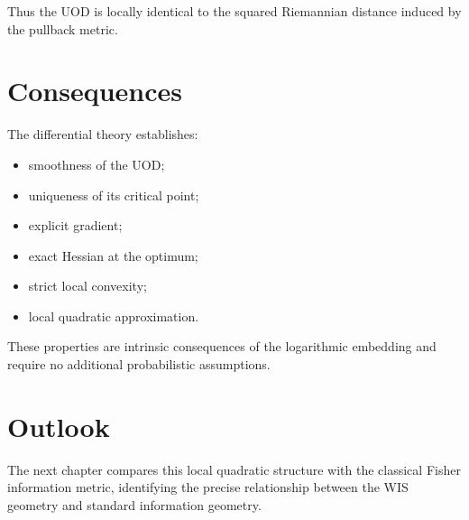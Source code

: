 Thus the UOD is locally identical to the squared Riemannian distance
induced by the pullback metric.

\section{Consequences}\label{ch:sec:consequences}

The differential theory establishes:
\begin{itemize}
\item smoothness of the UOD;
\item uniqueness of its critical point;
\item explicit gradient;
\item exact Hessian at the optimum;
\item strict local convexity;
\item local quadratic approximation.
\end{itemize}

These properties are intrinsic consequences of the logarithmic embedding
and require no additional probabilistic assumptions.

\section{Outlook}\label{ch:sec:outlook-analytic_uod}

The next chapter compares this local quadratic structure with the
classical Fisher information metric, identifying the precise
relationship between the WIS geometry and standard information geometry.


